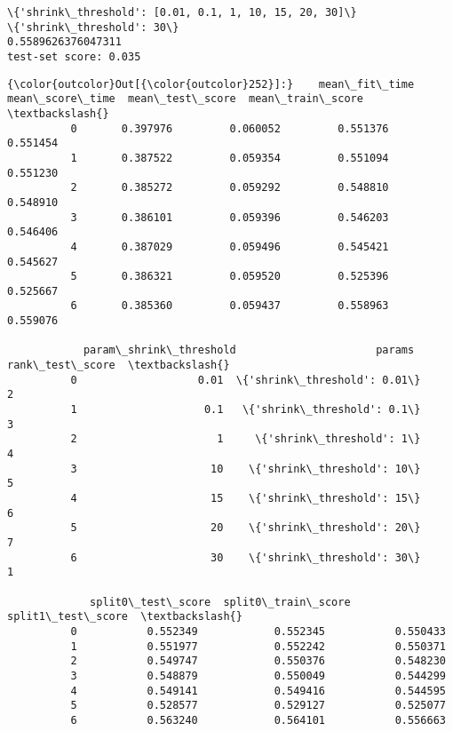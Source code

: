 \documentclass[11pt]{article}
\begin{document}
    \begin{Verbatim}[commandchars=\\\{\}]
\{'shrink\_threshold': [0.01, 0.1, 1, 10, 15, 20, 30]\}
\{'shrink\_threshold': 30\}
0.5589626376047311
test-set score: 0.035

    \end{Verbatim}

            \begin{Verbatim}[commandchars=\\\{\}]
{\color{outcolor}Out[{\color{outcolor}252}]:}    mean\_fit\_time  mean\_score\_time  mean\_test\_score  mean\_train\_score  \textbackslash{}
          0       0.397976         0.060052         0.551376          0.551454   
          1       0.387522         0.059354         0.551094          0.551230   
          2       0.385272         0.059292         0.548810          0.548910   
          3       0.386101         0.059396         0.546203          0.546406   
          4       0.387029         0.059496         0.545421          0.545627   
          5       0.386321         0.059520         0.525396          0.525667   
          6       0.385360         0.059437         0.558963          0.559076   
          
            param\_shrink\_threshold                      params  rank\_test\_score  \textbackslash{}
          0                   0.01  \{'shrink\_threshold': 0.01\}                2   
          1                    0.1   \{'shrink\_threshold': 0.1\}                3   
          2                      1     \{'shrink\_threshold': 1\}                4   
          3                     10    \{'shrink\_threshold': 10\}                5   
          4                     15    \{'shrink\_threshold': 15\}                6   
          5                     20    \{'shrink\_threshold': 20\}                7   
          6                     30    \{'shrink\_threshold': 30\}                1   
          
             split0\_test\_score  split0\_train\_score  split1\_test\_score  \textbackslash{}
          0           0.552349            0.552345           0.550433   
          1           0.551977            0.552242           0.550371   
          2           0.549747            0.550376           0.548230   
          3           0.548879            0.550049           0.544299   
          4           0.549141            0.549416           0.544595   
          5           0.528577            0.529127           0.525077   
          6           0.563240            0.564101           0.556663   
          

\end{Verbatim}
\end{document}
